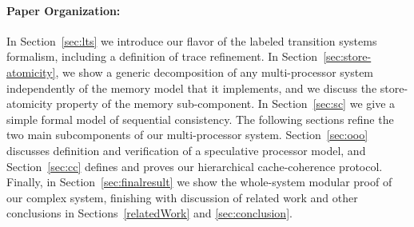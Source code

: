 \paragraph{Paper Organization:} In Section~\ref{sec:lts} we introduce our
flavor of the labeled transition systems formalism, including a definition of
trace refinement. In Section~\ref{sec:store-atomicity}, we show a generic
decomposition of any multi-processor system independently of the memory model
that it implements, and we discuss the store-atomicity property of the memory
sub-component. In Section~\ref{sec:sc} we
give a simple formal model of sequential consistency.  The
following sections refine the two main subcomponents of our multi-processor system.
Section~\ref{sec:ooo} discusses definition and verification of a speculative
processor model, and Section~\ref{sec:cc}
defines and proves our hierarchical cache-coherence protocol.  Finally, in
Section~\ref{sec:finalresult} we show the whole-system modular proof of our
complex system, finishing with discussion of related work and other conclusions in
Sections~\ref{relatedWork} and \ref{sec:conclusion}.




